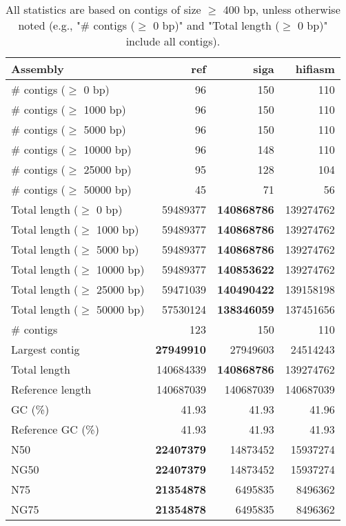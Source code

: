 \documentclass[12pt,a4paper]{article}
\begin{document}
\begin{table}[ht]
\begin{center}
\caption{All statistics are based on contigs of size $\geq$ 400 bp, unless otherwise noted (e.g., "\# contigs ($\geq$ 0 bp)" and "Total length ($\geq$ 0 bp)" include all contigs).}
\begin{tabular}{|l*{3}{|r}|}
\hline
Assembly & ref & siga & hifiasm \\ \hline
\# contigs ($\geq$ 0 bp) & 96 & 150 & 110 \\ \hline
\# contigs ($\geq$ 1000 bp) & 96 & 150 & 110 \\ \hline
\# contigs ($\geq$ 5000 bp) & 96 & 150 & 110 \\ \hline
\# contigs ($\geq$ 10000 bp) & 96 & 148 & 110 \\ \hline
\# contigs ($\geq$ 25000 bp) & 95 & 128 & 104 \\ \hline
\# contigs ($\geq$ 50000 bp) & 45 & 71 & 56 \\ \hline
Total length ($\geq$ 0 bp) & 59489377 & {\bf 140868786} & 139274762 \\ \hline
Total length ($\geq$ 1000 bp) & 59489377 & {\bf 140868786} & 139274762 \\ \hline
Total length ($\geq$ 5000 bp) & 59489377 & {\bf 140868786} & 139274762 \\ \hline
Total length ($\geq$ 10000 bp) & 59489377 & {\bf 140853622} & 139274762 \\ \hline
Total length ($\geq$ 25000 bp) & 59471039 & {\bf 140490422} & 139158198 \\ \hline
Total length ($\geq$ 50000 bp) & 57530124 & {\bf 138346059} & 137451656 \\ \hline
\# contigs & 123 & 150 & 110 \\ \hline
Largest contig & {\bf 27949910} & 27949603 & 24514243 \\ \hline
Total length & 140684339 & {\bf 140868786} & 139274762 \\ \hline
Reference length & 140687039 & 140687039 & 140687039 \\ \hline
GC (\%) & 41.93 & 41.93 & 41.96 \\ \hline
Reference GC (\%) & 41.93 & 41.93 & 41.93 \\ \hline
N50 & {\bf 22407379} & 14873452 & 15937274 \\ \hline
NG50 & {\bf 22407379} & 14873452 & 15937274 \\ \hline
N75 & {\bf 21354878} & 6495835 & 8496362 \\ \hline
NG75 & {\bf 21354878} & 6495835 & 8496362 \\ \hline

\end{tabular}
\end{center}
\end{table}
\end{document}
